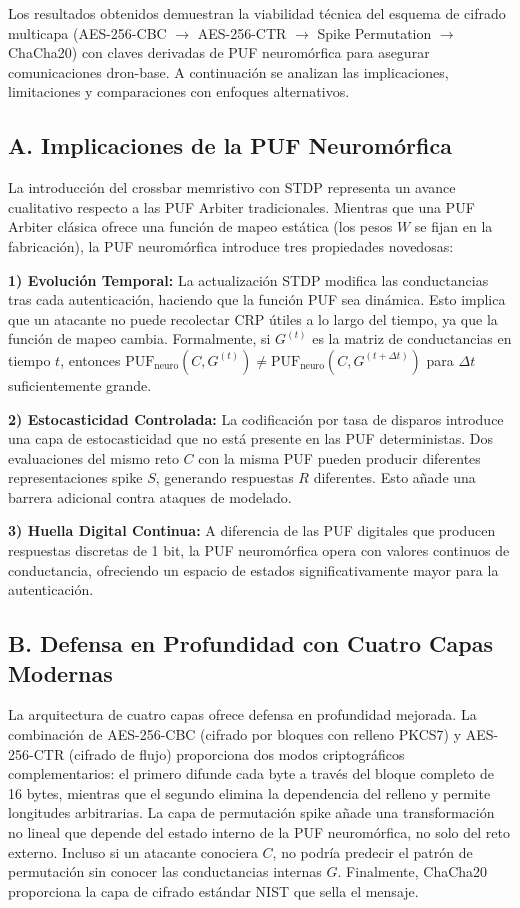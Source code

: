 Los resultados obtenidos demuestran la viabilidad técnica del esquema de cifrado multicapa (AES-256-CBC $\to$ AES-256-CTR $\to$ Spike Permutation $\to$ ChaCha20) con claves derivadas de PUF neuromórfica para asegurar comunicaciones dron-base. A continuación se analizan las implicaciones, limitaciones y comparaciones con enfoques alternativos.

\subsection*{A. Implicaciones de la PUF Neuromórfica}

La introducción del crossbar memristivo con STDP representa un avance cualitativo respecto a las PUF Arbiter tradicionales. Mientras que una PUF Arbiter clásica ofrece una función de mapeo estática (los pesos $W$ se fijan en la fabricación), la PUF neuromórfica introduce tres propiedades novedosas:

\textbf{1) Evolución Temporal:} La actualización STDP modifica las conductancias tras cada autenticación, haciendo que la función PUF sea dinámica. Esto implica que un atacante no puede recolectar CRP útiles a lo largo del tiempo, ya que la función de mapeo cambia. Formalmente, si $G^{(t)}$ es la matriz de conductancias en tiempo $t$, entonces $\text{PUF}_{\text{neuro}}(C, G^{(t)}) \neq \text{PUF}_{\text{neuro}}(C, G^{(t+\Delta t)})$ para $\Delta t$ suficientemente grande.

\textbf{2) Estocasticidad Controlada:} La codificación por tasa de disparos introduce una capa de estocasticidad que no está presente en las PUF deterministas. Dos evaluaciones del mismo reto $C$ con la misma PUF pueden producir diferentes representaciones spike $S$, generando respuestas $R$ diferentes. Esto añade una barrera adicional contra ataques de modelado.

\textbf{3) Huella Digital Continua:} A diferencia de las PUF digitales que producen respuestas discretas de 1 bit, la PUF neuromórfica opera con valores continuos de conductancia, ofreciendo un espacio de estados significativamente mayor para la autenticación.

\subsection*{B. Defensa en Profundidad con Cuatro Capas Modernas}

La arquitectura de cuatro capas ofrece defensa en profundidad mejorada. La combinación de AES-256-CBC (cifrado por bloques con relleno PKCS7) y AES-256-CTR (cifrado de flujo) proporciona dos modos criptográficos complementarios: el primero difunde cada byte a través del bloque completo de 16 bytes, mientras que el segundo elimina la dependencia del relleno y permite longitudes arbitrarias. La capa de permutación spike añade una transformación no lineal que depende del estado interno de la PUF neuromórfica, no solo del reto externo. Incluso si un atacante conociera $C$, no podría predecir el patrón de permutación sin conocer las conductancias internas $G$. Finalmente, ChaCha20 proporciona la capa de cifrado estándar NIST que sella el mensaje.

